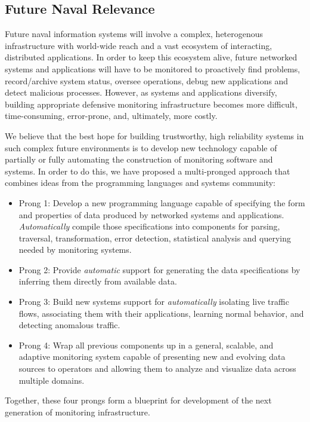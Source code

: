 \subsection{Future Naval Relevance}
\label{sec:naval}

Future naval information systems will involve a complex, heterogenous
infrastructure with world-wide reach and a vast ecosystem of
interacting, distributed applications.  In order to keep this
ecosystem alive, future networked systems and applications will have
to be monitored to proactively find problems, record/archive system
status, oversee operations, debug new applications and detect malicious
processes.  However, as systems and applications diversify, building
appropriate defensive monitoring infrastructure becomes more
difficult, time-consuming, error-prone, and, ultimately, more costly.

We believe that the best hope for building trustworthy,
high reliability systems in such complex future environments
is to develop new technology capable of partially or fully automating
the construction of monitoring software and systems.  In order to
do this, we have proposed a multi-pronged approach that combines
ideas from the programming languages and systems community:

\begin{itemize}
\item Prong 1:  Develop a new programming language capable of specifying the 
form and properties of data produced by networked systems and 
applications.  {\em Automatically} compile those specifications into 
components for parsing, traversal, transformation, error detection,
statistical analysis and querying needed by monitoring systems.

\item Prong 2:  Provide {\em automatic} support for generating the data 
specifications by inferring them directly from available data.

\item Prong 3:  Build new systems support for {\em automatically}
isolating live traffic flows, associating them with their applications,
learning normal behavior, and detecting anomalous traffic.

\item Prong 4:  Wrap all previous components up in a general, scalable,
and adaptive monitoring system capable of
presenting new and evolving data sources to operators and allowing them to
analyze and visualize data across multiple domains.
\end{itemize}

Together, these four prongs form a blueprint for development of the
next generation of monitoring infrastructure.
